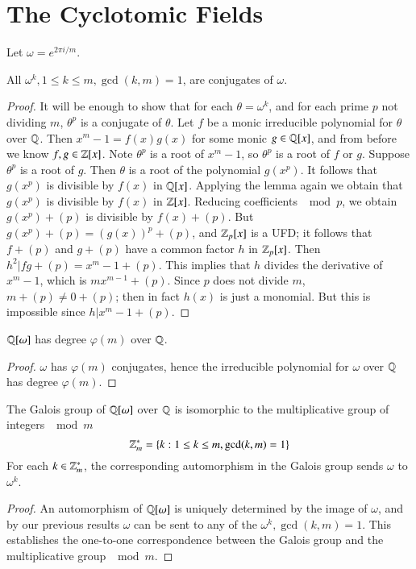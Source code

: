 \section{The Cyclotomic Fields}
\label{sec:cycloField}

Let $\omega = e^{2\pi i/m}$. 

\begin{thm}
    All $\omega^k, 1\leq k\leq m, \gcd(k,m) = 1$, are conjugates of $\omega$.
\end{thm}
\begin{proof}
    It will be enough to show that for each $\theta = \omega^k$, and for each prime $p$ not dividing $m$, $\theta^p$ is a conjugate of $\theta$. Let $f$ be a monic irreducible polynomial for $\theta$ over $\mathbb Q$. Then $x^m-1 = f(x)g(x)$ for some monic $g \in \mathbb Q[x]$, and from before we know $f,g \in \mathbb Z[x]$. Note $\theta^p$ is a root of $x^m-1$, so $\theta^p$ is a root of $f$ or $g$. Suppose $\theta^p$ is a root of $g$. Then $\theta$ is a root of the polynomial $g(x^p)$. It follows that $g(x^p)$ is divisible by $f(x)$ in $\mathbb Q[x]$. Applying the lemma again we obtain that $g(x^p)$ is divisible by $f(x)$ in $\mathbb Z[x]$. Reducing coefficients $\mod p$, we obtain $g(x^p)+(p)$ is divisible by $f(x)+(p)$. But $g(x^p)+(p) = (g(x))^p+(p)$, and $\mathbb Z_p[x]$ is a UFD; it follows that $f+(p)$ and $g+(p)$ have a common factor $h$ in $\mathbb Z_p[x]$. Then $h^2\vert fg+(p) = x^m-1+(p)$. This implies that $h$ divides the derivative of $x^m-1$, which is $mx^{m-1}+(p)$. Since $p$ does not divide $m$, $m+(p)\neq 0+(p)$; then in fact $h(x)$ is just a monomial. But this is impossible since $h\vert x^m-1+(p)$.
\end{proof}

\begin{cor}
    $\mathbb Q[\omega]$ has degree $\varphi(m)$ over $\mathbb Q$.
\end{cor}
\begin{proof}
    $\omega$ has $\varphi(m)$ conjugates, hence the irreducible polynomial for $\omega$ over $\mathbb Q$ has degree $\varphi(m)$.
\end{proof}

\begin{cor}
    The Galois group of $\mathbb Q[\omega]$ over $\mathbb Q$ is isomorphic to the multiplicative group of integers $\mod m$ $$\mathbb Z^*_m = \{k:1\leq k \leq m,\gcd(k,m) = 1\}$$
    For each $k \in \mathbb Z^*_m$, the corresponding automorphism in the Galois group sends $\omega$ to $\omega^k$.
\end{cor}
\begin{proof}
    An automorphism of $\mathbb Q[\omega]$ is uniquely determined by the image of $\omega$, and by our previous results $\omega$ can be sent to any of the $\omega^k,\gcd(k,m) = 1$. This establishes the one-to-one correspondence between the Galois group and the multiplicative group $\mod m$.
\end{proof}

